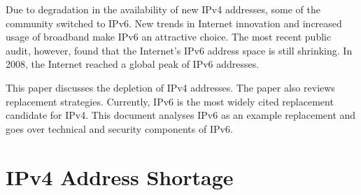 \documentclass[conference]{IEEEtran}
\begin{document}
Due to degradation in the availability of new IPv4 addresses, some of the community switched to IPv6. New trends in Internet innovation and increased usage of broadband make IPv6 an attractive choice. The most recent public audit, however, found that the Internet's IPv6 address space is still shrinking. In 2008, the Internet reached a global peak of IPv6 addresses.

This paper discusses the depletion of IPv4 addresses. The paper also reviews replacement strategies. Currently, IPv6 is the most widely cited replacement candidate for IPv4. This document analyses IPv6 as an example replacement and goes over technical and security components of IPv6.

\section{IPv4 Address Shortage}
\end{document}
